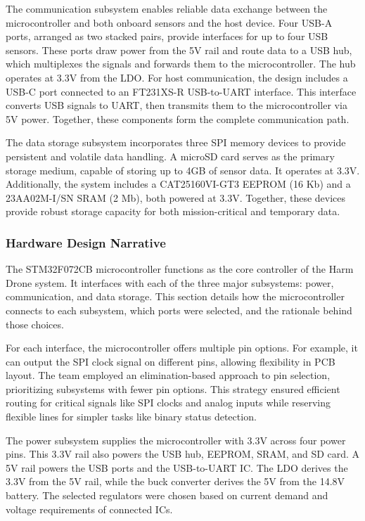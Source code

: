 \documentclass[12pt]{article}
\begin{document}
The communication subsystem enables reliable data exchange between the microcontroller and both onboard sensors and the host device. Four USB-A ports, arranged as two stacked pairs, provide interfaces for up to four USB sensors. These ports draw power from the 5V rail and route data to a USB hub, which multiplexes the signals and forwards them to the microcontroller. The hub operates at 3.3V from the LDO. For host communication, the design includes a USB-C port connected to an FT231XS-R USB-to-UART interface. This interface converts USB signals to UART, then transmits them to the microcontroller via 5V power. Together, these components form the complete communication path.

The data storage subsystem incorporates three SPI memory devices to provide persistent and volatile data handling. A microSD card serves as the primary storage medium, capable of storing up to 4GB of sensor data. It operates at 3.3V. Additionally, the system includes a CAT25160VI-GT3 EEPROM (16 Kb) and a 23AA02M-I/SN SRAM (2 Mb), both powered at 3.3V. Together, these devices provide robust storage capacity for both mission-critical and temporary data.

\subsubsection{Hardware Design Narrative}

The STM32F072CB microcontroller functions as the core controller of the Harm Drone system. It interfaces with each of the three major subsystems: power, communication, and data storage. This section details how the microcontroller connects to each subsystem, which ports were selected, and the rationale behind those choices.

For each interface, the microcontroller offers multiple pin options. For example, it can output the SPI clock signal on different pins, allowing flexibility in PCB layout. The team employed an elimination-based approach to pin selection, prioritizing subsystems with fewer pin options. This strategy ensured efficient routing for critical signals like SPI clocks and analog inputs while reserving flexible lines for simpler tasks like binary status detection.

The power subsystem supplies the microcontroller with 3.3V across four power pins. This 3.3V rail also powers the USB hub, EEPROM, SRAM, and SD card. A 5V rail powers the USB ports and the USB-to-UART IC. The LDO derives the 3.3V from the 5V rail, while the buck converter derives the 5V from the 14.8V battery. The selected regulators were chosen based on current demand and voltage requirements of connected ICs.
\end{document}
